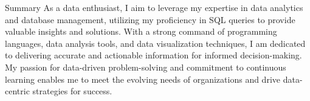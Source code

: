 \documentclass[]{mcdowellcv}
\begin{document}
	\makeheader

        \begin{cvsection}{Summary}\vspace{6pt}
            \setlength{\parindent}{0.5in}
                As a data enthusiast, I aim to leverage my expertise in data analytics and database management, utilizing my proficiency in SQL queries to provide valuable insights and solutions. With a strong command of programming languages, data analysis tools, and data visualization techniques, I am dedicated to delivering accurate and actionable information for informed decision-making. My passion for data-driven problem-solving and commitment to continuous learning enables me to meet the evolving needs of organizations and drive data-centric strategies for success.
        \end{cvsection}


        
	
\end{document}
